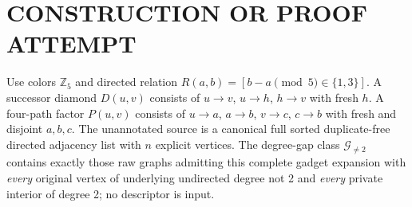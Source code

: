 \documentclass[11pt]{article}
\begin{document}
\section{CONSTRUCTION OR PROOF ATTEMPT}
Use colors $\mathbb Z_5$ and directed relation $R(a,b)=[b-a\pmod5\in\{1,3\}]$.
A successor diamond $D(u,v)$ consists of $u\to v$, $u\to h$, $h\to v$ with fresh $h$.
A four-path factor $P(u,v)$ consists of $u\to a$, $a\to b$, $v\to c$, $c\to b$ with fresh and disjoint $a,b,c$.
The unannotated source is a canonical full sorted duplicate-free directed adjacency list with $n$ explicit vertices. The degree-gap class $\mathcal G_{\ne2}$ contains exactly those raw graphs admitting this complete gadget expansion with \emph{every} original vertex of underlying undirected degree not 2 and \emph{every} private interior of degree 2; no descriptor is input.
\end{document}
